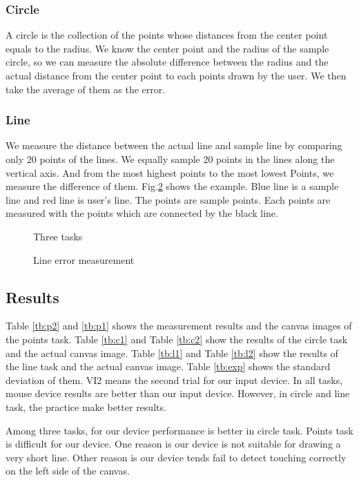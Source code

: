 \subsubsection{Circle}
A circle is the collection of the points whose distances from the center point equals to the radius.
We know the center point and the radius of the sample circle, so we can measure the absolute difference between the radius and the actual distance from the center point to each points drawn by the user. We then take the average of them as the error.
\subsubsection{Line}
We measure the distance between the actual line and sample line by comparing only 20 points of the lines. We equally sample 20 points in the lines along the vertical axis. And from the most highest points to the most lowest Points, we measure the difference of them.
Fig.\ref{linem} shows the example. Blue line is a sample line and red line is user's line. The points are sample points. Each points are measured with the points which are connected by the black line.
\begin{figure}[htbp]

 \caption{Three tasks}
 \label{task}
\end{figure}

\begin{figure}[htbp]
 \centering
 
 \caption{Line error measurement}
 \label{linem}
\end{figure}


\subsection{Results}
Table \ref{tb:p2} and \ref{tb:p1} shows the measurement results and the canvas images of the points task. Table \ref{tb:c1} and Table \ref{tb:c2} show the results of the circle task and the actual canvas image. Table \ref{tb:l1} and Table \ref{tb:l2} show the results of the line task and the actual canvas image. Table \ref{tb:exp} shows the standard deviation of them. 
VI2 means the second trial for our input device. 
In all tasks, mouse device results are better than our input device. 
However, in circle and line task, the practice make better results.

Among three tasks, for our device performance is better in circle task.
Points task is difficult for our device. One reason is our device is not suitable for drawing a very short line. 
Other reason is our device tends fail to detect touching correctly on the left side of the canvas.

